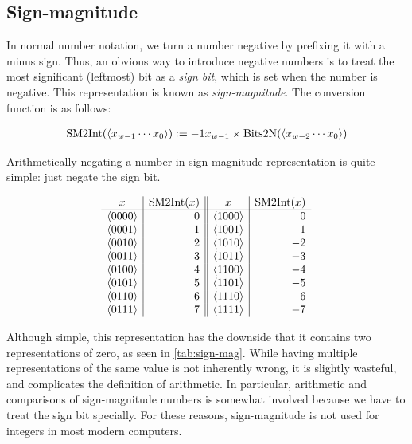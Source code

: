 \subsection{Sign-magnitude}
\label{sec:sign-magnitude}

In normal number notation, we turn a number negative by prefixing it
with a minus sign.  Thus, an obvious way to introduce negative numbers
is to treat the most significant (leftmost) bit as a \emph{sign bit},
which is set when the number is negative.  This representation is
known as \emph{sign-magnitude}.  The conversion function is as
follows:

\begin{definition}
\begin{align*}
  \mathrm{SM2Int}(\langle x_{w-1}\cdots x_{0} \rangle) \vcentcolon= -1x_{w-1} \times \mathrm{Bits2N}(\langle x_{w-2}\cdots x_{0} \rangle)
\end{align*}
\label{def:sm2int}
\end{definition}

Arithmetically negating a number in sign-magnitude representation is
quite simple: just negate the sign bit.

\begin{table}
  \centering
  \[
  \begin{array}{c|r||c|r}
    x & \mathrm{SM2Int}(x) & x & \mathrm{SM2Int}(x) \\\hline
    \langle 0000 \rangle & 0 & \langle 1000 \rangle & 0 \\
    \langle 0001 \rangle & 1 & \langle 1001 \rangle & -1 \\
    \langle 0010 \rangle & 2 & \langle 1010 \rangle & -2 \\
    \langle 0011 \rangle & 3 & \langle 1011 \rangle & -3 \\
    \langle 0100 \rangle & 4 & \langle 1100 \rangle & -4 \\
    \langle 0101 \rangle & 5 & \langle 1101 \rangle & -5 \\
    \langle 0110 \rangle & 6 & \langle 1110 \rangle & -6 \\
    \langle 0111 \rangle & 7 & \langle 1111 \rangle & -7 \\
  \end{array}
  \]
  \caption{All possible four-bit words interpreted as integers using
    sign-magnitude representation.}
  \label{tab:sign-mag}
\end{table}

Although simple, this representation has the downside that it contains
two representations of zero, as seen in \cref{tab:sign-mag}.  While
having multiple representations of the same value is not inherently
wrong, it is slightly wasteful, and complicates the definition of
arithmetic.  In particular, arithmetic and comparisons of
sign-magnitude numbers is somewhat involved because we have to treat
the sign bit specially.  For these reasons, sign-magnitude is not used
for integers in most modern computers.


